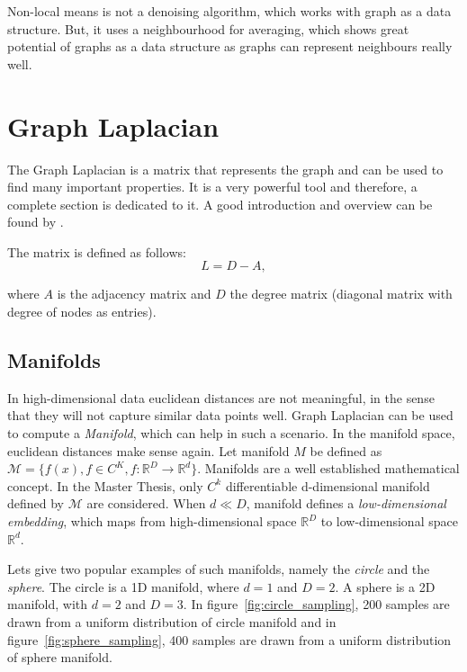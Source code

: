 Non-local means is not a denoising algorithm, which works with graph as a data structure.
But, it uses a neighbourhood for averaging, which shows great potential of graphs
as a data structure as graphs can represent neighbours really well.


\section{Graph Laplacian}
The Graph Laplacian is a matrix that represents the graph and can be used to find many important properties.
It is a very powerful tool and therefore, a complete section is dedicated to it.
A good introduction and overview can be found by \cite{tutorialSpectralClustering, SpectralGraphTheory}. 

The matrix is defined as follows:
\begin{equation}
    L = D - A,
\end{equation}

where $A$ is the adjacency matrix and $D$ the degree matrix (diagonal matrix with degree of nodes as entries).

\subsection{Manifolds}
\label{sec:manifolds}

In high-dimensional data euclidean distances are not meaningful,
in the sense that they will not capture similar data points well.
Graph Laplacian can be used to compute a \textit{Manifold}, which can help in such a scenario. 
In the manifold space, euclidean distances make sense again. 
Let manifold $M$ be defined as $\mathcal{M} = \{ f(x), f \in C^K, f: \mathbb{R}^D \to \mathbb{R}^d \}$.
Manifolds are a well established mathematical concept. In the Master Thesis, only 
$C^k$ differentiable d-dimensional manifold defined by $\mathcal{M}$ are considered. 
When $d \ll D$, manifold defines a \textit{low-dimensional embedding}, which maps from high-dimensional space 
$\mathbb{R}^D$ to low-dimensional space $\mathbb{R}^d$.

Lets give two popular examples of such manifolds, namely the \textit{circle} and the \textit{sphere}.
The circle is a 1D manifold, where $d=1$ and $D=2$. A sphere is a 2D manifold, with $d=2$ and $D=3$.
In figure~\ref{fig:circle_sampling}, 200 samples are drawn from a uniform distribution of circle manifold
and in figure~\ref{fig:sphere_sampling}, 400 samples are drawn from a uniform distribution of sphere manifold.

